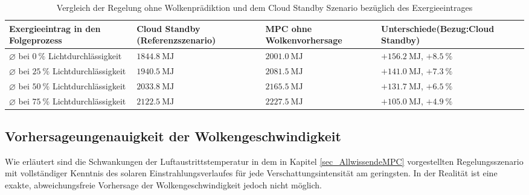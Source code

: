 \enlargethispage{2\baselineskip}
\begingroup
\renewcommand{\arraystretch}{1.2}
\begin{table}[ht!]
    \caption[Vergleich der Regelung ohne Wolkenprädiktion und dem Cloud Standby Szenario bezüglich des Exergieeintrages]{Vergleich der Regelung ohne Wolkenprädiktion und dem Cloud Standby Szenario bezüglich des Exergieeintrages}
    \centering
    \begin{tabular}{>{\centering\arraybackslash}m{}>{\centering\arraybackslash}m{}>{\centering\arraybackslash}m{}>{\centering\arraybackslash}m{}}
        \rowcolor{white}
        \toprule
        Exergieeintrag in den Folgeprozess                       & Cloud Standby (Referenzszenario) & MPC ohne Wolkenvorhersage  & Unterschiede\linebreak (Bezug:\linebreak Cloud Standby) \\
        \midrule
        $\diameter$ bei $\SI{0}{\percent}$ Lichtdurchlässigkeit  & $\SI{1844.8}{\mega\joule}$       & $\SI{2001.0}{\mega\joule}$ & $+\SI{156.2}{\mega\joule}$, $+\SI{8.5}{\percent}$       \\
        $\diameter$ bei $\SI{25}{\percent}$ Lichtdurchlässigkeit & $\SI{1940.5}{\mega\joule}$       & $\SI{2081.5}{\mega\joule}$ & $+\SI{141.0}{\mega\joule}$, $+\SI{7.3}{\percent}$       \\
        $\diameter$ bei $\SI{50}{\percent}$ Lichtdurchlässigkeit & $\SI{2033.8}{\mega\joule}$       & $\SI{2165.5}{\mega\joule}$ & $+\SI{131.7}{\mega\joule}$, $+\SI{6.5}{\percent}$       \\
        $\diameter$ bei $\SI{75}{\percent}$ Lichtdurchlässigkeit & $\SI{2122.5}{\mega\joule}$       & $\SI{2227.5}{\mega\joule}$ & $+\SI{105.0}{\mega\joule}$, $+\SI{4.9}{\percent}$       \\
        \toprule
    \end{tabular}
    \label{tab_exergie2}
\end{table}
\endgroup


\subsection{Vorhersageungenauigkeit der Wolkengeschwindigkeit} \label{subsec_speedpräd}
Wie erläutert sind die Schwankungen der Luftaustrittstemperatur in dem in Kapitel \ref{sec_AllwissendeMPC} vorgestellten Regelungsszenario mit vollständiger Kenntnis des solaren Einstrahlungsverlaufes für jede Verschattungsintensität am geringsten.
In der Realität ist eine exakte, abweichungsfreie Vorhersage der Wolkengeschwindigkeit jedoch nicht möglich.

